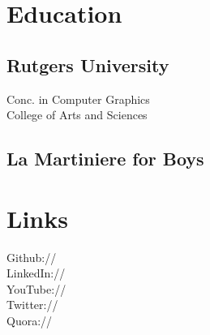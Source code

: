 \documentclass[]{deedy-resume-openfont}
\begin{document}
%
%


%
%

\begin{minipage}[t]{0.33\textwidth} 


\section{Education} 

\subsection{Rutgers University}
\sectionsep


Conc. in Computer Graphics \\
College of Arts and Sciences \\
\sectionsep

\subsection{La Martiniere for Boys}
\sectionsep


\section{Links} 
Github:// \href{https://github.com/11}
{} \\
LinkedIn://  \href{https://www.linkedin.com/in/DougRudolphJr}{} \\
YouTube://  \href{https://www.youtube.com/user/DeedyDash007}{} \\
Twitter://  \href{https://twitter.com/debarghya_das}{} \\
Quora://  \href{https://www.quora.com/Debarghya-Das}{}
\sectionsep


\end{minipage}
\end{document}
